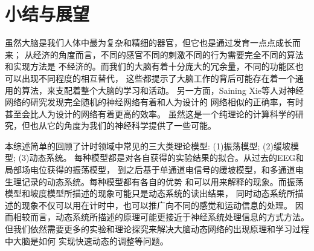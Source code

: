 \section{小结与展望}

虽然大脑是我们人体中最为复杂和精细的器官，但它也是通过发育一点点成长而来；
从经济的角度而言，不同的感官不同的刺激不同的行为需要完全不同的算法和实现方法是
不经济的。而我们的大脑有着十分庞大的冗余量，不同的功能区也可以出现不同程度的相互替代，
这些都提示了大脑工作的背后可能存在着一个通用的算法，来支配着整个大脑的学习和活动。
另一方面，Saining Xie等人对神经网络的研究发现完全随机的神经网络有着和人为设计的
网络相似的正确率，有时甚至会比人为设计的网络有着更高的效率\cite{xie2019exploring}。
虽然这是一个纯理论的计算科学的研究，但也从它的角度为我们的神经科学提供了一些可能。

本综述简单的回顾了计时领域中常见的三大类理论模型: (1)振荡模型; (2)缓坡模型; (3)动态系统。
每种模型都是对各自获得的实验结果的拟合。从过去的EEG和局部场电位获得的振荡模型，
到之后基于单通道电信号的缓坡模型，和多通道电生理记录的动态系统。每种模型都有各自的优势
和可以用来解释的现象。而振荡模型和坡度模型所描述的现象可能只是动态系统的读出结果，
同时动态系统所描述的现象不仅可以用在计时中，也可以推广向不同的感觉和运动信息的处理。
因而相较而言，动态系统所描述的原理可能更接近于神经系统处理信息的方式方法。
但我们依然需要更多的实验和理论探究来解决大脑动态网络的出现原理和学习过程中大脑是如何
实现快速动态的调整等问题。

